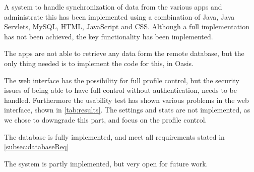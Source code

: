 A system to handle synchronization of data from the various apps and administrate this has been implemented using a combination of Java, Java Servlets, MySQL, HTML, JavaScript and CSS. Although a full implementation has not been achieved, the key functionality has been implemented. 

The apps are not able to retrieve any data form the remote database, but the only thing needed is to implement the code for this, in Oasis. 

The web interface has the possibility for full profile control, but the security issues of being able to have full control without authentication, needs to be handled. Furthermore the usability test has shown various problems in the web interface, shown in \autoref{tab:results}. The settings and stats are not implemented, as we chose to downgrade this part, and focus on the profile control.
 
The database is fully implemented, and meet all requirements stated in \autoref{subsec:databaseReq}

The system is partly implemented, but very open for future work.






